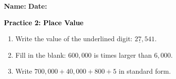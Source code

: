 \documentclass[12pt, letterpaper, fleqn]{article}
\newcommand{\blank}{\underline{\hspace{2.2cm}}}
\begin{document}
\textbf{Name:} \underline{\hspace{5cm}}
\hfill
\textbf{Date:} \underline{\hspace{3cm}}\\

\begin{tcolorbox}[colback=customteal!20]
    \large\textcolor{black}{\textbf{Practice 2: Place Value}}
\end{tcolorbox}
\begin{enumerate}[itemsep=3.5cm, leftmargin=0.6cm]
\item Write the value of the underlined digit: $2\underline{7},541$.
\vspace{3cm}
\item Fill in the blank: $600,000$ is \blank times larger than $6,000$.
\vspace{3cm}
\item Write $700,000 + 40,000 + 800 + 5$ in standard form.
\end{enumerate}
\end{document}
